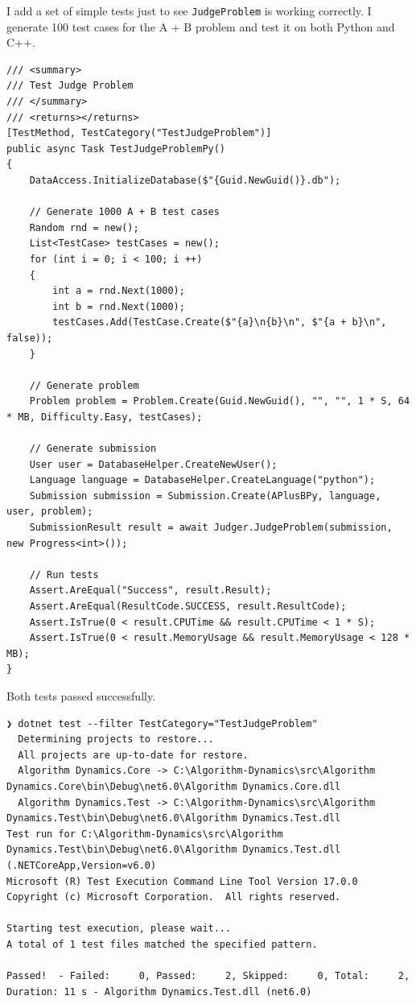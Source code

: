 \documentclass[a4paper]{report}
\newcommand{\code}{\texttt}
\begin{document}
I add a set of simple tests just to see \code{JudgeProblem} is working correctly. I generate 100 test cases for the A + B problem and test it on both Python and C++.

\begin{verbatim}
/// <summary>
/// Test Judge Problem
/// </summary>
/// <returns></returns>
[TestMethod, TestCategory("TestJudgeProblem")]
public async Task TestJudgeProblemPy()
{
    DataAccess.InitializeDatabase($"{Guid.NewGuid()}.db");

    // Generate 1000 A + B test cases
    Random rnd = new();
    List<TestCase> testCases = new();
    for (int i = 0; i < 100; i ++)
    {
        int a = rnd.Next(1000);
        int b = rnd.Next(1000);
        testCases.Add(TestCase.Create($"{a}\n{b}\n", $"{a + b}\n", false));
    }
    
    // Generate problem
    Problem problem = Problem.Create(Guid.NewGuid(), "", "", 1 * S, 64 * MB, Difficulty.Easy, testCases);

    // Generate submission
    User user = DatabaseHelper.CreateNewUser();
    Language language = DatabaseHelper.CreateLanguage("python");
    Submission submission = Submission.Create(APlusBPy, language, user, problem);
    SubmissionResult result = await Judger.JudgeProblem(submission, new Progress<int>());

    // Run tests
    Assert.AreEqual("Success", result.Result);
    Assert.AreEqual(ResultCode.SUCCESS, result.ResultCode);
    Assert.IsTrue(0 < result.CPUTime && result.CPUTime < 1 * S);
    Assert.IsTrue(0 < result.MemoryUsage && result.MemoryUsage < 128 * MB);
}
\end{verbatim}

Both tests passed successfully.

\begin{verbatim}
❯ dotnet test --filter TestCategory="TestJudgeProblem"
  Determining projects to restore...
  All projects are up-to-date for restore.
  Algorithm Dynamics.Core -> C:\Algorithm-Dynamics\src\Algorithm Dynamics.Core\bin\Debug\net6.0\Algorithm Dynamics.Core.dll
  Algorithm Dynamics.Test -> C:\Algorithm-Dynamics\src\Algorithm Dynamics.Test\bin\Debug\net6.0\Algorithm Dynamics.Test.dll
Test run for C:\Algorithm-Dynamics\src\Algorithm Dynamics.Test\bin\Debug\net6.0\Algorithm Dynamics.Test.dll (.NETCoreApp,Version=v6.0)
Microsoft (R) Test Execution Command Line Tool Version 17.0.0
Copyright (c) Microsoft Corporation.  All rights reserved.

Starting test execution, please wait...
A total of 1 test files matched the specified pattern.

Passed!  - Failed:     0, Passed:     2, Skipped:     0, Total:     2, Duration: 11 s - Algorithm Dynamics.Test.dll (net6.0)
\end{verbatim}
\end{document}
